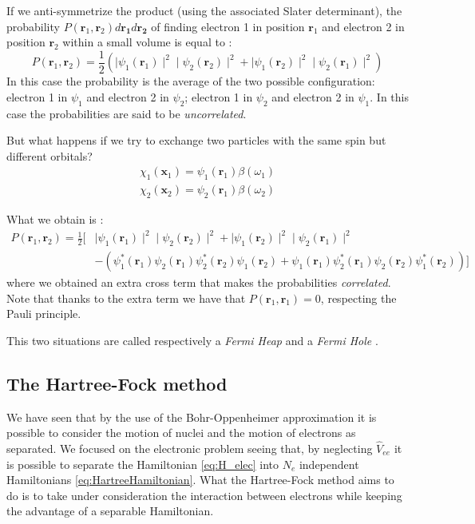 \documentclass[a4paper,12pt]{article}
\begin{document}
If we anti-symmetrize the product (using the associated Slater determinant), the probability $P(\mathbf{r}_{1},\mathbf{r}_{2}) d\mathbf{r_{1}} d\mathbf{r_{2}}$ of finding electron 1 in position $\mathbf{r}_{1}$ and electron 2 in position $\mathbf{r}_{2}$ within a small volume is equal to \cite[p.52]{Attila}:
\begin{equation*}
	P(\mathbf{r}_{1},\mathbf{r}_{2}) = 
		\frac{1}{2} ( 
			\mid \psi_{1}(\mathbf{r}_1) \mid ^2    
			\mid \psi_{2}(\mathbf{r}_2) \mid ^2   
				+
			\mid \psi_{1}(\mathbf{r}_2) \mid ^2    
			\mid \psi_{2}(\mathbf{r}_1) \mid ^2   
			)
\end{equation*}
In this case the probability is the average of the two possible configuration: electron 1 in $\psi_1$ and electron 2 in $\psi_2$; electron 1 in $\psi_2$ and electron 2 in $\psi_1$.
In this case the probabilities are said to be \textit{uncorrelated}.

But what happens if we try to exchange two particles with the same spin but different orbitals?
\begin{align*}
	\chi_{1}(\mathbf{x}_{1}) = \psi_{1}(\mathbf{r}_{1}) \beta(\omega_{1})\\
	\chi_{2}(\mathbf{x}_{2}) = \psi_{2}(\mathbf{r}_{1}) \beta(\omega_{2})
\end{align*}

What we obtain is \cite[p.53]{Attila}:
\begin{align*}
	P(\mathbf{r}_{1},\mathbf{r}_{2}) = 
		\frac{1}{2} [ &
			\mid \psi_{1}(\mathbf{r}_1) \mid ^2    
			\mid \psi_{2}(\mathbf{r}_2) \mid ^2   
				+
			\mid \psi_{1}(\mathbf{r}_2) \mid ^2    
			\mid \psi_{2}(\mathbf{r}_1) \mid ^2   
\\
			& - ( \psi_{1}^*(\mathbf{r}_1) \psi_{2}(\mathbf{r}_1) \psi_{2}^*(\mathbf{r}_2) \psi_{1}(\mathbf{r}_2)
			 + \psi_{1}(\mathbf{r}_1) \psi_{2}^*(\mathbf{r}_1) \psi_{2}(\mathbf{r}_2) \psi_{1}^*(\mathbf{r}_2))]
\end{align*}
where we obtained an extra cross term that makes the probabilities \textit{correlated}. Note that thanks to the extra term we have that $P(\mathbf{r}_{1},\mathbf{r}_{1}) = 0$, respecting the Pauli principle.

This two situations are called respectively a \textit{Fermi Heap} and a \textit{Fermi Hole} \cite{Dan}.


\subsection{The Hartree-Fock method}
We have seen that by the use of the Bohr-Oppenheimer approximation it is possible to consider the motion of nuclei and the motion of electrons as separated. 
We focused on the electronic problem seeing that, by neglecting $\hat{V}_{ee}$ it is possible to separate the Hamiltonian \eqref{eq:H_elec} into $N_e$ independent Hamiltonians \eqref{eq:HartreeHamiltonian}.
What the Hartree-Fock method aims to do is to take under consideration the interaction between electrons while keeping the advantage of a separable Hamiltonian.
\end{document}
